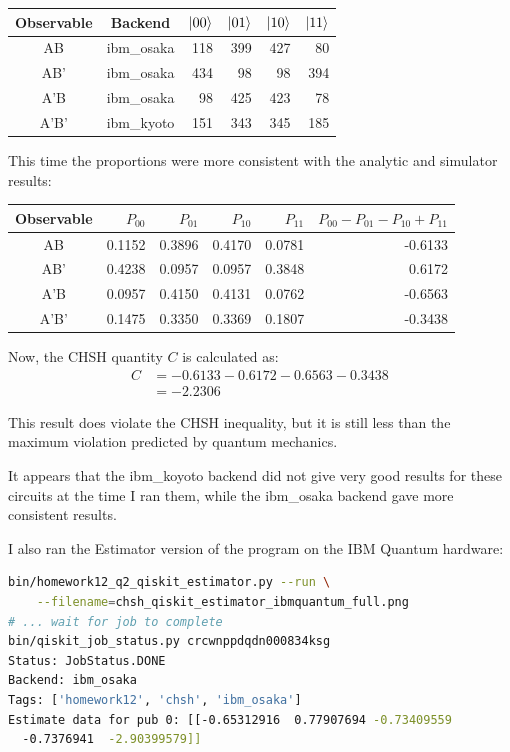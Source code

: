 \documentclass[12pt]{extarticle}
\begin{document}
\begin{enumerate}[(a)]
\begin{center}
\begin{tabular}{|c|c|r|r|r|r|}
\hline
Observable & Backend & $\ket{00}$ & $\ket{01}$ & $\ket{10}$ & $\ket{11}$  \\
\hline
AB   & ibm\_osaka & 118 & 399 & 427 &  80 \\
AB'  & ibm\_osaka & 434 &  98 &  98 & 394 \\
A'B  & ibm\_osaka &  98 & 425 & 423 &  78 \\
A'B' & ibm\_kyoto & 151 & 343 & 345 & 185 \\
\hline
\end{tabular}
\end{center}

This time the proportions were more consistent with the analytic and simulator results:

\begin{center}
\begin{tabular}{|c|r|r|r|r|r|}
\hline
Observable & $P_{00}$ & $P_{01}$ & $P_{10}$ & $P_{11}$ & $P_{00} - P_{01} - P_{10} + P_{11}$ \\
\hline
AB   & 0.1152 & 0.3896 & 0.4170 & 0.0781 & -0.6133 \\
AB'  & 0.4238 & 0.0957 & 0.0957 & 0.3848 &  0.6172 \\
A'B  & 0.0957 & 0.4150 & 0.4131 & 0.0762 & -0.6563 \\
A'B' & 0.1475 & 0.3350 & 0.3369 & 0.1807 & -0.3438 \\
\hline
\end{tabular}
\end{center}

Now, the CHSH quantity $C$ is calculated as:
\begin{align*}
C & = -0.6133 - 0.6172 - 0.6563 - 0.3438 \\
& = -2.2306
\end{align*}

This result does violate the CHSH inequality, but it is still less than the maximum violation predicted by quantum mechanics.

It appears that the ibm\_koyoto backend did not give very good results for these circuits at the time I ran them,
while the ibm\_osaka backend gave more consistent results.

I also ran the Estimator version of the program on the IBM Quantum hardware:

\begin{small}
\begin{lstlisting}[language=bash]
bin/homework12_q2_qiskit_estimator.py --run \
    --filename=chsh_qiskit_estimator_ibmquantum_full.png
# ... wait for job to complete
bin/qiskit_job_status.py crcwnppdqdn000834ksg
Status: JobStatus.DONE
Backend: ibm_osaka
Tags: ['homework12', 'chsh', 'ibm_osaka']
Estimate data for pub 0: [[-0.65312916  0.77907694 -0.73409559
  -0.7376941  -2.90399579]]
\end{lstlisting}
\end{small}


\end{enumerate}
\end{document}
